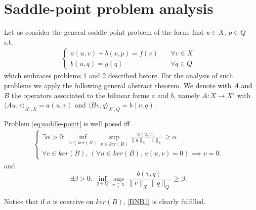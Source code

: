 \section{Saddle-point problem analysis}
Let us consider the general saddle point problem of the form: find $u\in X$, $p\in Q$ s.t.
\begin{eqnarray}\label{eq:saddle-point}
\begin{cases}
a(u,v)+b(v,p)=f(v)\quad &\forall v\in X\\
b(u,q)=g(q) \quad &\forall q\in Q
\end{cases}
\end{eqnarray}
which embraces problems 1 and 2 described before.
For the analysis of such problems we apply the following general abstract theorem.
We denote with $A$ and $B$ the operators associated to the bilinear forms $a$ and $b$, 
namely $A: X \longrightarrow X'$ with $\langle Au,v\rangle _{X',X} = a(u,v)$ and $\langle Bv,q\rangle_{X',Q} = b(v,q)$.
\begin{theorem}\label{th:bnb}
Problem \eqref{eq:saddle-point} is well posed iff 
\begin{eqnarray}\label{BNB1}
\begin{cases}
\exists \alpha >0 :\, \inf_{u\in ker(B)}\sup_{v\in ker(B)} \frac{a(u,v)}{\|u\|_{X}\|v\|_{X}}\geq \alpha\\
\forall v \in ker(B), \, \left( \forall u \in ker(B),\, a(u,v)=0 \right)\implies v=0.
\end{cases}
\end{eqnarray}
and 
\begin{equation}\label{eq:infsup}
\exists \beta >0:\,\inf_{q\in Q}\sup_{v\in X} \frac{b(v,q)}{\|v\|_{X}\|q\|_{Q}}\geq \beta .
\end{equation}
\end{theorem} 
Notice that if $a$ is coercive on $ker(B)$, \eqref{BNB1} is clearly fulfilled. 

